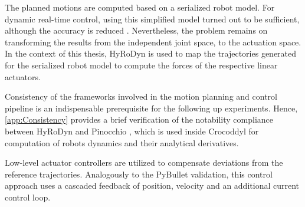 The planned motions are computed based on a serialized robot model. For dynamic real-time control, using this simplified model turned out to be sufficient, although the accuracy is reduced \cite{kumar2019model}. Nevertheless, the problem remains on transforming the results from the independent joint space, to the actuation space. In the context of this thesis, HyRoDyn is used to map the trajectories generated for the serialized robot model to compute the forces of the respective linear actuators.

Consistency of the frameworks involved in the motion planning and control pipeline is an indispensable prerequisite for the following up experiments. Hence, \cref{app:Consistency} provides a brief verification of the notability compliance between HyRoDyn and Pinocchio \cite{carpentier2019pinocchio}, which is used inside Crocoddyl for computation of robots dynamics and their analytical derivatives. 

Low-level actuator controllers are utilized to compensate deviations from the reference trajectories. Analogously to the PyBullet validation, this control approach uses a cascaded feedback of position, velocity and an additional current control loop. 

